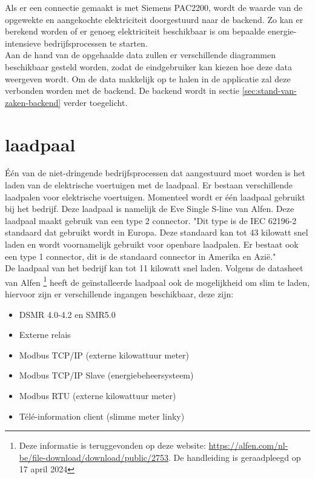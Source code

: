 Als er een connectie gemaakt is met Siemens PAC2200, wordt de waarde van de opgewekte en aangekochte elektriciteit doorgestuurd naar de backend. Zo kan er berekend worden of er genoeg elektriciteit beschikbaar is om bepaalde energie-intensieve bedrijfsprocessen te starten.\\

Aan de hand van de opgehaalde data zullen er verschillende diagrammen beschikbaar gesteld worden, zodat de eindgebruiker kan kiezen hoe deze data weergeven wordt. Om de data makkelijk op te halen in de applicatie zal deze verbonden worden met de backend. De backend wordt in sectie \ref{sec:stand-van-zaken-backend} verder toegelicht.

\section{laadpaal}
\label{sec:stand-van-zaken-laadpaal}

Één van de niet-dringende bedrijfsprocessen dat aangestuurd moet worden is het laden van de elektrische voertuigen met de laadpaal. Er bestaan verschillende laadpalen voor elektrische voertuigen. Momenteel wordt er één laadpaal gebruikt bij het bedrijf. Deze laadpaal is namelijk de Eve Single S-line van Alfen. Deze laadpaal maakt gebruik van een type 2 connector. "Dit type is de IEC 62196-2 standaard dat gebruikt wordt in Europa. Deze standaard kan tot 43 kilowatt snel laden en wordt voornamelijk gebruikt voor openbare laadpalen. Er bestaat ook een type 1 connector, dit is de standaard connector in Amerika en Azië." \autocite{HEMAVATHI2022105013} \\

De laadpaal van het bedrijf kan tot 11 kilowatt snel laden. Volgens de datasheet van Alfen \footnote{Deze informatie is teruggevonden op deze website: \url{https://alfen.com/nl-be/file-download/download/public/2753}. De handleiding is geraadpleegd op 17 april 2024} heeft de geïnstalleerde laadpaal ook de mogelijkheid om slim te laden, hiervoor zijn er verschillende ingangen beschikbaar, deze zijn:

\begin{itemize}
    \item DSMR 4.0-4.2 en SMR5.0
    \item Externe relais
    \item Modbus TCP/IP (externe kilowattuur meter)
    \item Modbus TCP/IP Slave (energiebeheersysteem)
    \item Modbus RTU (externe kilowattuur meter)
    \item Télé-information client (slimme meter linky)
\end{itemize}

